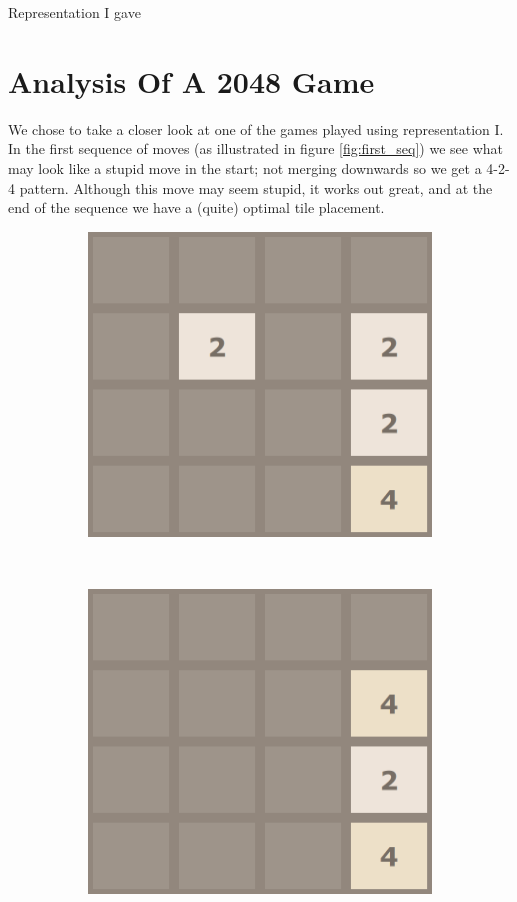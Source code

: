 \documentclass[11pt,a4paper]{article}
\begin{document}
Representation I gave  



\section*{Analysis Of A 2048 Game}
We chose to take a closer look at one of the games played using representation I. In the first sequence of moves (as illustrated in figure \ref{fig:first_seq}) we see what may look like a stupid move in the start; not merging downwards so we get a 4-2-4 pattern. Although this move may seem stupid, it works out great, and at the end of the sequence we have a (quite) optimal tile placement.

\begin{figure}[h!]
    \centering
    \begin{subfigure}[b]{0.22\textwidth}
        \includegraphics[width=\textwidth]{figures/1}
    \end{subfigure}
    ~
    \begin{subfigure}[b]{0.22\textwidth}
        \includegraphics[width=\textwidth]{figures/2}

\end{subfigure}
\end{figure}
\end{document}
